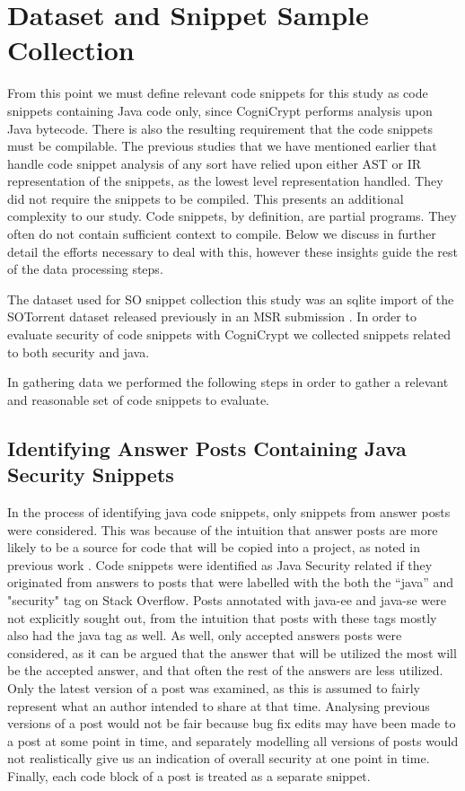 \documentclass[10pt, conference]{IEEEtran}
\begin{document}
\section{Dataset and Snippet Sample Collection}


From this point we must define relevant code snippets for this study as code snippets containing Java code only, since CogniCrypt performs analysis upon Java bytecode. There is also the resulting requirement that the code snippets must be compilable. The previous studies that we have mentioned earlier that handle code snippet analysis of any sort have relied upon either AST or IR representation of the snippets, as the lowest level representation handled. They did not require the snippets to be compiled. This presents an additional complexity to our study. Code snippets, by definition, are partial programs. They often do not contain sufficient context to compile. Below we discuss in further detail the efforts necessary to deal with this, however these insights guide the rest of the data processing steps.

The dataset used for SO snippet collection this study was an sqlite import \cite{wong_2019} of the SOTorrent dataset released previously in an MSR submission \cite{DBLP:conf/msr/BaltesDT008}. In order to evaluate security of code snippets with CogniCrypt we collected snippets related to both security and java. 

In gathering data we performed the following steps in order to gather a relevant and reasonable set of code snippets to evaluate.

\subsection{Identifying Answer Posts Containing Java Security Snippets}
In the process of identifying java code snippets, only snippets from answer posts were considered. This was because of the intuition that answer posts are more likely to be a source for code that will be copied into a project, as noted in previous work \cite{7958574}. Code snippets were identified as Java Security related if they originated from answers to posts that were labelled with the both the “java” and "security" tag on Stack Overflow. Posts annotated with java-ee and java-se were not explicitly sought out, from the intuition that posts with these tags mostly also had the java tag as well. As well, only accepted answers posts were considered, as it can be argued that the answer that will be utilized the most will be the accepted answer, and that often the rest of the answers are less utilized. Only the latest version of a post was examined, as this is assumed to fairly represent what an author intended to share at that time. Analysing previous versions of a post would not be fair because bug fix edits may have been made to a post at some point in time, and separately modelling all versions of posts would not realistically give us an indication of overall security at one point in time. Finally, each code block of a post is treated as a separate snippet.  
\end{document}
